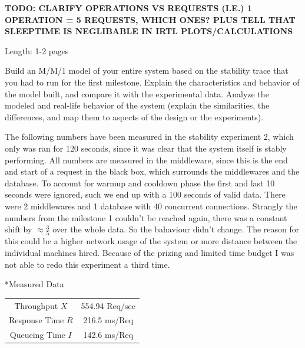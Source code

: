 \documentclass[11pt]{article}
\begin{document}
\textbf{TODO: CLARIFY OPERATIONS VS REQUESTS (I.E.) 1 OPERATION = 5 REQUESTS, WHICH ONES? PLUS TELL THAT SLEEPTIME IS NEGLIBABLE IN IRTL PLOTS/CALCULATIONS}

Length: 1-2 pages

Build an M/M/1 model of your entire system based on the stability trace that you had to run for the first milestone. Explain the characteristics and behavior of the model built, and compare it with the experimental data. Analyze the modeled and real-life behavior of the system (explain the similarities, the differences, and map them to aspects of the design or the experiments).

The following numbers have been measured in the stability experiment 2, which only was ran for 120 seconds, since it was clear that the system itself is stably performing. All numbers are measured in the middleware, since this is the end and start of a request in the black box, which surrounds the middlewares and the database. To account for warmup and cooldown phase the first and last 10 seconds were ignored, such we end up with a 100 seconds of valid data. There were 2 middlewares and 1 database with 40 concurrent connections. Strangly the numbers from the milestone 1 couldn't be reached again, there was a constant shift by $\approx\frac{3}{5}$ over the whole data. So the bahaviour didn't change. The reason for this could be a higher network usage of the system or more distance between the individual machines hired. Because of the prizing and limited time budget I was not able to redo this experiment a third time.
\begin{center}
	*{Measured Data} 
	\begin{tabular}{c|c}
		\hline
		Throughput $X$ & 554.94 Req/sec \\
		Response Time $R$ & 216.5 ms/Req \\
		Queueing Time $I$ & 142.6 ms/Req \\ \hline		
	\end{tabular}
\end{center}
\end{document}
